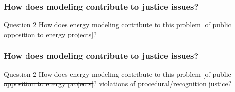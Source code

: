 


\begin{frame}
    \frametitle{How does modeling contribute to justice issues?}

    \begin{block}{Question 2}
        How does energy modeling contribute to this problem [of public opposition to energy projects]?    
    \end{block}
\end{frame}

\begin{frame}
    \frametitle{How does modeling contribute to justice issues?}

    \begin{block}{Question 2}
        How does energy modeling contribute to \st{this problem [of public opposition to energy projects]}?
        \hspace{2.5cm} violations of procedural/recognition justice?    
    \end{block}
\end{frame}


